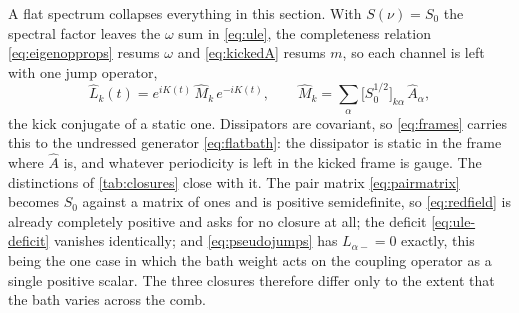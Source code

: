 \documentclass[a4paper,11pt]{article}
\newcommand{\Dcal}{\mathcal{D}}
\begin{document}
A flat spectrum collapses everything in this section. With $S(\nu) = S_0$ the spectral factor leaves the $\omega$ sum in \eqref{eq:ule}, the completeness relation \eqref{eq:eigenopprops} resums $\omega$ and \eqref{eq:kickedA} resums $m$, so each channel is left with one jump operator,
\begin{equation}\label{eq:ule-flat}
  \hat L_k(t) = e^{iK(t)}\,\hat M_k\,e^{-iK(t)},
  \qquad
  \hat M_k = \sum_\alpha\big[S_0^{1/2}\big]_{k\alpha}\,\hat A_\alpha ,
\end{equation}
the kick conjugate of a static one. Dissipators are covariant, so \eqref{eq:frames} carries this to the undressed generator \eqref{eq:flatbath}: the dissipator is static in the frame where $\hat A$ is, and whatever periodicity is left in the kicked frame is gauge. The distinctions of \cref{tab:closures} close with it. The pair matrix \eqref{eq:pairmatrix} becomes $S_0$ against a matrix of ones and is positive semidefinite, so \eqref{eq:redfield} is already completely positive and asks for no closure at all; the deficit \eqref{eq:ule-deficit} vanishes identically; and \eqref{eq:pseudojumps} has $L_{\alpha-} = 0$ exactly, this being the one case in which the bath weight acts on the coupling operator as a single positive scalar. The three closures therefore differ only to the extent that the bath varies across the comb.

\end{document}
